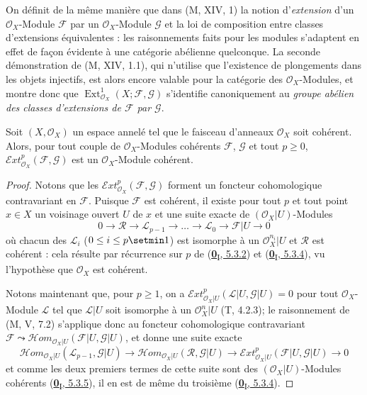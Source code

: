 \begin{env}[12.3.2]
\label{0.12.3.2-fr}
On définit de la même manière que dans (M, XIV, 1) la notion d'\emph{extension} d'un
$\mathcal O_X$-Module $\mathcal F$ par un $\mathcal O_X$-Module $\mathcal G$
et la loi de composition entre classes d'extensions équivalentes : les
raisonnements faits pour les modules s'adaptent en effet de façon évidente à
une catégorie abélienne quelconque. La seconde démonstration de (M, XIV, 1.1),
qui n'utilise que l'existence de plongements dans les objets injectifs, est
alors encore valable pour la catégorie des $\mathcal O_X$-Modules, et montre
donc que $\operatorname{Ext}_{\mathcal O_X}^1(X;\mathcal F,\mathcal G)$
s'identifie canoniquement au \emph{groupe abélien des classes d'extensions de
$\mathcal F$ par $\mathcal G$}.
\end{env}

\begin{proposition}[12.3.3]
\label{0.12.3.3-fr}
Soit $(X,\mathcal O_X)$ un espace annelé tel que le faisceau d'anneaux
$\mathcal O_X$ soit cohérent. Alors, pour tout couple de
$\mathcal O_X$-Modules cohérents $\mathcal F$, $\mathcal G$ et tout
$p\geq0$, $\mathcal{E}xt_{\mathcal O_X}^p(\mathcal F,\mathcal G)$ est un
$\mathcal O_X$-Module cohérent.
\end{proposition}

\begin{proof}
Notons que les $\mathcal{E}xt_{\mathcal O_X}^p(\mathcal F,\mathcal G)$
forment un foncteur cohomologique contravariant en $\mathcal F$. Puisque
$\mathcal F$ est cohérent, il existe pour tout $p$ et tout point $x\in X$ un
voisinage ouvert $U$ de $x$ et une suite exacte de
$(\mathcal O_X|U)$-Modules
\[
0\longrightarrow\mathcal R\longrightarrow\mathcal L_{p-1}
\longrightarrow\ldots\longrightarrow\mathcal L_0
\longrightarrow\mathcal F|U\longrightarrow0
\]
où chacun des $\mathcal L_i$ ($0\leq i\leq p\setmin 1$) est isomorphe à un
$\mathcal O_X^{n_i}|U$ et $\mathcal R$ est cohérent : cela résulte par
récurrence sur $p$ de (\hyperref[0.5.3.2-fr]{\textbf{0}\textsubscript{I}, 5.3.2}) et
(\hyperref[0.5.3.4-fr]{\textbf{0}\textsubscript{I}, 5.3.4}), vu l'hypothèse que
$\mathcal O_X$ est cohérent.

Notons maintenant que, pour $p\geq1$, on a
$\mathcal{E}xt_{\mathcal O_X|U}^p(\mathcal L|U,\mathcal G|U)=0$
pour tout $\mathcal O_X$-Module $\mathcal L$ tel que $\mathcal L|U$ soit
isomorphe à un $\mathcal O_X^n|U$ (T, 4.2.3); le raisonnement de (M, V, 7.2)
s'applique donc au foncteur cohomologique contravariant
$\mathcal F\leadsto
\mathcal{H}om_{\mathcal O_X|U}(\mathcal F|U,\mathcal G|U)$,
et donne une suite exacte
\[
\mathcal{H}om_{\mathcal O_X|U}(\mathcal L_{p-1},\mathcal G|U)
\longrightarrow
\mathcal{H}om_{\mathcal O_X|U}(\mathcal R,\mathcal G|U)
\longrightarrow
\mathcal{E}xt_{\mathcal O_X|U}^p(\mathcal F|U,\mathcal G|U)
\longrightarrow0
\]
et comme les deux premiers termes de cette suite sont des
$(\mathcal O_X|U)$-Modules cohérents
(\hyperref[0.5.3.5-fr]{\textbf{0}\textsubscript{I}, 5.3.5}), il en est de même du
troisième (\hyperref[0.5.3.4-fr]{\textbf{0}\textsubscript{I}, 5.3.4}).
\end{proof}

